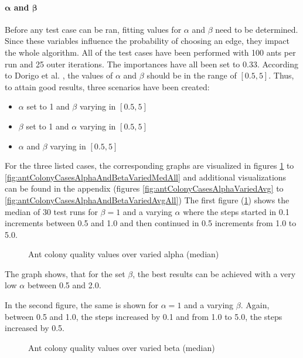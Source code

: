 \paragraph{$\mathbf{\alpha}$ and $\mathbf{\beta}$}

Before any test case can be ran, fitting values for $\alpha$ and $\beta$ need to be determined.
Since these variables influence the probability of choosing an edge, they impact the whole algorithm.
All of the test cases have been performed with 100 ants per run and 25 outer iterations.
The importances have all been set to 0.33. 
According to Dorigo et al. \cite{dorigo_ant_1996}, the values of $\alpha$ and $\beta$ should be in the range of $[0.5,5]$.
Thus, to attain good results, three scenarios have been created:
\begin{itemize}
	\item $\alpha$ set to 1 and $\beta$ varying in $[0.5, 5]$
	\item $\beta$ set to 1 and $\alpha$ varying in $[0.5, 5]$
	\item $\alpha$ and $\beta$ varying in $[0.5, 5]$
\end{itemize}


For the three listed cases, the corresponding graphs are visualized in figures \ref{fig:antColonyCasesAlphaVariedMed} to \ref{fig:antColonyCasesAlphaAndBetaVariedMedAll} and additional visualizations can be found in the appendix (figures \ref{fig:antColonyCasesAlphaVariedAvg} to \ref{fig:antColonyCasesAlphaAndBetaVariedAvgAll})
The first figure (\ref{fig:antColonyCasesAlphaVariedMed}) shows the median of 30 test runs for  $\beta = 1$ and a varying $\alpha$ where the steps started in 0.1 increments between 0.5 and 1.0 and then continued in 0.5 increments from 1.0 to 5.0.


\begin{figure}[H]
	\centering
	
	\caption{Ant colony quality values over varied alpha (median)}
	\label{fig:antColonyCasesAlphaVariedMed}
\end{figure}


The graph shows, that for the set $\beta$, the best results can be achieved with a very low $\alpha$ between 0.5 and 2.0.

In the second figure, the same is shown for $\alpha = 1$ and a varying $\beta$.
Again, between 0.5 and 1.0, the steps increased by 0.1 and from 1.0 to 5.0, the steps increased by 0.5.


\begin{figure}[H]
	\centering
	
	\caption{Ant colony quality values over varied beta (median)}
	\label{fig:antColonyCasesBetaVariedMed}
\end{figure}

